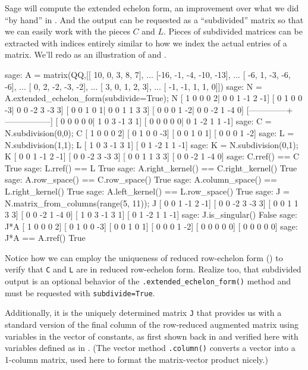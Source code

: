 Sage will compute the extended echelon form, an improvement over what we did ``by hand'' in .  And the output can be requested as a ``subdivided'' matrix so that we can easily work with the pieces $C$ and $L$.  Pieces of subdivided matrices can be extracted with indices entirely similar to how we index the actual entries of a matrix.  We'll redo  as an illustration of  and .
%
\begin{sageexample}
sage: A = matrix(QQ,[[ 10,  0,  3,   8,   7],
...                  [-16, -1, -4, -10, -13],
...                  [ -6,  1, -3,  -6,  -6],
...                  [  0,  2, -2,  -3,  -2],
...                  [  3,  0,  1,   2,   3],
...                  [ -1, -1,  1,   1,   0]])
sage: N = A.extended_echelon_form(subdivide=True); N
[ 1  0  0  0  2| 0  0  1 -1  2 -1]
[ 0  1  0  0 -3| 0  0 -2  3 -3  3]
[ 0  0  1  0  1| 0  0  1  1  3  3]
[ 0  0  0  1 -2| 0  0 -2  1 -4  0]
[--------------+-----------------]
[ 0  0  0  0  0| 1  0  3 -1  3  1]
[ 0  0  0  0  0| 0  1 -2  1  1 -1]
sage: C = N.subdivision(0,0); C
[ 1  0  0  0  2]
[ 0  1  0  0 -3]
[ 0  0  1  0  1]
[ 0  0  0  1 -2]
sage: L = N.subdivision(1,1); L
[ 1  0  3 -1  3  1]
[ 0  1 -2  1  1 -1]
sage: K = N.subdivision(0,1); K
[ 0  0  1 -1  2 -1]
[ 0  0 -2  3 -3  3]
[ 0  0  1  1  3  3]
[ 0  0 -2  1 -4  0]
sage: C.rref() == C
True
sage: L.rref() == L
True
sage: A.right_kernel() == C.right_kernel()
True
sage: A.row_space() == C.row_space()
True
sage: A.column_space() == L.right_kernel()
True
sage: A.left_kernel() == L.row_space()
True
sage: J = N.matrix_from_columns(range(5, 11)); J
[ 0  0  1 -1  2 -1]
[ 0  0 -2  3 -3  3]
[ 0  0  1  1  3  3]
[ 0  0 -2  1 -4  0]
[ 1  0  3 -1  3  1]
[ 0  1 -2  1  1 -1]
sage: J.is_singular()
False
sage: J*A
[ 1  0  0  0  2]
[ 0  1  0  0 -3]
[ 0  0  1  0  1]
[ 0  0  0  1 -2]
[ 0  0  0  0  0]
[ 0  0  0  0  0]
sage: J*A == A.rref()
True
\end{sageexample}
%
Notice how we can employ the uniqueness of reduced row-echelon form () to verify that \verb?C? and \verb?L? are in reduced row-echelon form.  Realize too, that subdivided output is an optional behavior of the \verb?.extended_echelon_form()? method and must be requested with \verb?subdivide=True?.\par
%
Additionally, it is the uniquely determined matrix \verb?J? that provides us with a standard version of the final column of the row-reduced augmented matrix using variables in the vector of constants, as first shown back in  and verified here with variables defined as in .  (The vector method \verb?.column()? converts a vector into a 1-column matrix, used here to format the matrix-vector product nicely.)
